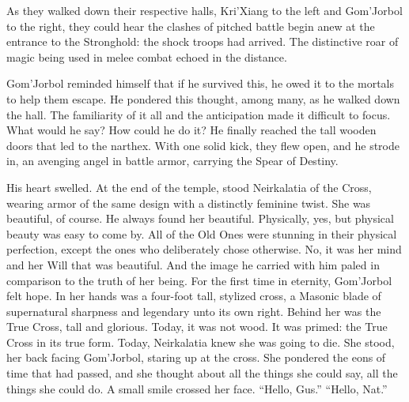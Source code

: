 As they walked down their respective halls, Kri’Xiang to the left and Gom’Jorbol to the right, they could hear the clashes of pitched battle begin anew at the entrance to the Stronghold: the shock troops had arrived. The distinctive roar of magic being used in melee combat echoed in the distance.

Gom’Jorbol reminded himself that if he survived this, he owed it to the mortals to help them escape. He pondered this thought, among many, as he walked down the hall. The familiarity of it all and the anticipation made it difficult to focus. What would he say? How could he do it?
\SmallVSpace
He finally reached the tall wooden doors that led to the narthex. With one solid kick, they flew open, and he strode in, an avenging angel in battle armor, carrying the Spear of Destiny.

His heart swelled. At the end of the temple, stood Neirkalatia of the Cross, wearing armor of the same design with a distinctly feminine twist. She was beautiful, of course. He always found her beautiful. Physically, yes, but physical beauty was easy to come by. All of the Old Ones were stunning in their physical perfection, except the ones who deliberately chose otherwise. No, it was her mind and her Will that was beautiful. And the image he carried with him paled in comparison to the truth of her being. For the first time in eternity, Gom’Jorbol felt hope.
\SmallVSpace
In her hands was a four-foot tall, stylized cross, a Masonic blade of supernatural sharpness and legendary unto its own right. Behind her was the True Cross, tall and glorious. Today, it was not wood. It was primed: the True Cross in its true form.
\SmallVSpace
Today, Neirkalatia knew she was going to die.
\SmallVSpace
She stood, her back facing Gom’Jorbol, staring up at the cross. She pondered the eons of time that had passed, and she thought about all the things she could say, all the things she could do. A small smile crossed her face.
\SomeVSpace
“Hello, Gus.”
\SmallVSpace
“Hello, Nat.”
